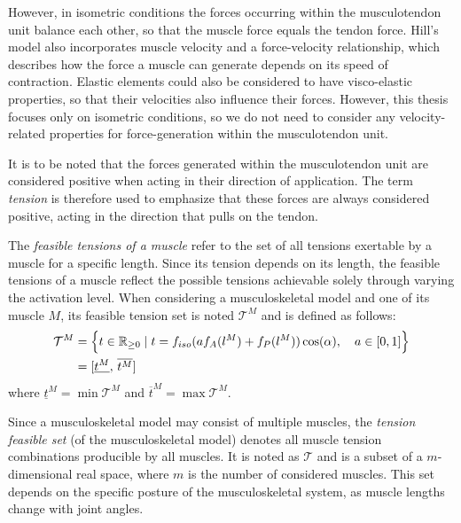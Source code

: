 However, in isometric conditions the forces occurring within the musculotendon unit balance each other, so that the muscle force equals the tendon force. Hill's model also incorporates muscle velocity and a force-velocity relationship, which describes how the force a muscle can generate depends on its speed of contraction. Elastic elements could also be considered to have visco-elastic properties, so that their velocities also influence their forces. However, this thesis focuses only on isometric conditions, so we do not need to consider any velocity-related properties for force-generation within the musculotendon unit.

It is to be noted that the forces generated within the musculotendon unit are considered positive when acting in their direction of application. The term \emph{tension} is therefore used to emphasize that these forces are always considered positive, acting in the direction that pulls on the tendon. 


The \emph{feasible tensions of a muscle} refer to the set of all tensions exertable by a muscle for a specific length. Since its tension depends on its length, the feasible tensions of a muscle reflect the possible tensions achievable solely through varying the activation level. When considering a musculoskeletal model and one of its muscle $M$, its feasible tension set is noted $\mathcal{T}^M$ and is defined as follows:
\begin{align*}
    \mathcal{T}^M &= \left\{ t\in \mathbb{R}_{\geq 0} \mid t = f_{iso}(af_A(l^M) + f_P(l^M))\cos (\alpha),\quad a\in [0,1]\right\} \\
    &= [\underline{t^M}, \, \overline{t^M}]
\end{align*}
where $\underline{t}^M = \min \mathcal{T}^M$ and $\overline{t}^M = \max \mathcal{T}^M$. 

Since a musculoskeletal model may consist of multiple muscles, the \emph{tension feasible set} (of the musculoskeletal model) denotes all muscle tension combinations producible by all muscles. It is noted as $\mathcal{T}$ and is a subset of a $m$-dimensional real space, where $m$ is the number of considered muscles. This set depends on the specific posture of the musculoskeletal system, as muscle lengths change with joint angles.

